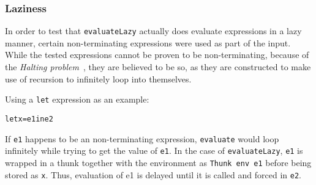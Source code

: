 \subsubsection{Laziness}
\label{lazinessSem}
In order to test that \texttt{evaluateLazy} actually does evaluate expressions
in a lazy manner, certain non-terminating expressions were used as part of the
input. While the tested expressions cannot be proven to be non-terminating,
because of the \textit{Halting problem}~\cite{haltingproblem}, they are believed
to be so, as they are constructed to make use of recursion to infinitely loop
into themselves.

Using a \texttt{let} expression as an example:
\begin{alltt}
  let x = e1 in e2
\end{alltt}
If \texttt{e1} happens to be an non-terminating expression, \texttt{evaluate}
would loop infinitely while trying to get the value of \texttt{e1}.
In the case of \texttt{evaluateLazy}, \texttt{e1} is wrapped in a thunk
together with the environment as \texttt{Thunk env e1} before being stored
as \texttt{x}. Thus, evaluation of e1 is delayed until it is called and forced
in \texttt{e2}.

